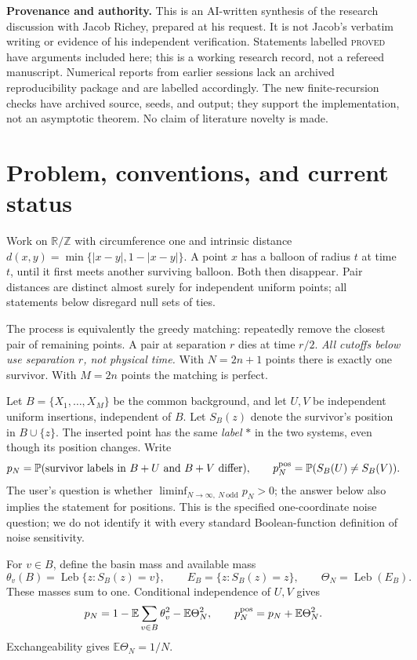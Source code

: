 \documentclass[11pt,letterpaper]{article}
\newcommand{\PP}{\mathbb P}\newcommand{\EE}{\mathbb E}
\newcommand{\T}{\mathbb R/\mathbb Z}\newcommand{\Leb}{\operatorname{Leb}}
\begin{document}
\textbf{Provenance and authority.} This is an AI-written synthesis of the
research discussion with Jacob Richey, prepared at his request. It is not
Jacob's verbatim writing or evidence of his independent verification.
Statements labelled \textsc{proved} have arguments included here; this is a
working research record, not a refereed manuscript. Numerical reports from
earlier sessions lack an archived reproducibility package and are labelled
accordingly. The new finite-recursion checks have archived source, seeds,
and output; they support the implementation, not an asymptotic theorem.
No claim of literature novelty is made.

{\small\setlength{\parskip}{0pt}\setcounter{tocdepth}{1}\tableofcontents}
\clearpage

\section{Problem, conventions, and current status}\label{sec:problem}

Work on $\T$ with circumference one and intrinsic distance
$d(x,y)=\min\{|x-y|,1-|x-y|\}$. A point $x$ has a balloon of radius $t$ at
time $t$, until it first meets another surviving balloon. Both then disappear.
Pair distances are distinct almost surely for independent uniform points;
all statements below disregard null sets of ties.

The process is equivalently the greedy matching: repeatedly remove the
closest pair of remaining points. A pair at separation $r$ dies at time
$r/2$. \emph{All cutoffs below use separation $r$, not physical time.}
With $N=2n+1$ points there is exactly one survivor. With $M=2n$ points the
matching is perfect.

Let $B=\{X_1,\ldots,X_M\}$ be the common background, and let $U,V$ be
independent uniform insertions, independent of $B$. Let $S_B(z)$ denote the
survivor's position in $B\cup\{z\}$. The inserted point has the same
\emph{label} $*$ in the two systems, even though its position changes.
Write
\[
 p_N=\PP(\text{survivor labels in }B+U\text{ and }B+V\text{ differ}),\qquad
 p_N^{\rm pos}=\PP(S_B(U)\ne S_B(V)).
\]
The user's question is whether $\liminf_{N\to\infty,\ N\ \mathrm{odd}}p_N>0$;
the answer below also implies the statement for positions. This is the
specified one-coordinate noise question; we do not identify it with every
standard Boolean-function definition of noise sensitivity.

For $v\in B$, define the basin mass and available mass
\[
 \theta_v(B)=\Leb\{z:S_B(z)=v\},\qquad
 E_B=\{z:S_B(z)=z\},\qquad \Theta_N=\Leb(E_B).
\]
These masses sum to one. Conditional independence of $U,V$ gives
\begin{equation}\label{eq:noise-identity}
 p_N=1-\EE\sum_{v\in B}\theta_v^2-\EE\Theta_N^2,
 \qquad p_N^{\rm pos}=p_N+\EE\Theta_N^2.
\end{equation}
Exchangeability gives $\EE\Theta_N=1/N$.
\end{document}

